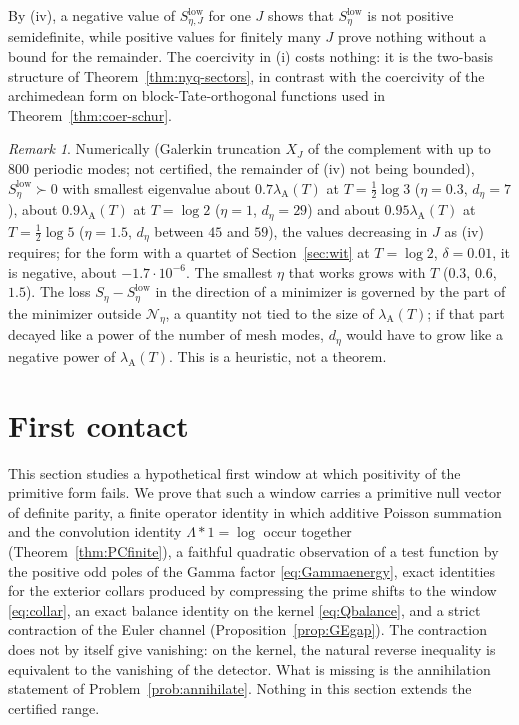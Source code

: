 \documentclass[11pt]{amsart}
\theoremstyle{definition}
\theoremstyle{remark}
\newtheorem{remark}[theorem]{Remark}
\newcommand{\lamA}{\lambda_{\mathrm A}(T)}
\begin{document}
By (iv), a negative value of $S^{\mathrm{low}}_{\eta,J}$ for one $J$ shows that $S^{\mathrm{low}}_\eta$ is not
positive semidefinite, while positive values for finitely many $J$ prove nothing without a bound for the remainder.
The coercivity in (i) costs nothing: it is the two-basis structure of Theorem~\ref{thm:nyq-sectors}, in contrast with
the coercivity of the archimedean form on block-Tate-orthogonal functions used in Theorem~\ref{thm:coer-schur}.

\begin{remark}\label{rem:nyq-schur-num}
Numerically (Galerkin truncation $X_J$ of the complement with up to $800$ periodic modes; not certified, the
remainder of (iv) not being bounded), $S^{\mathrm{low}}_\eta\succ0$ with smallest eigenvalue about $0.7\lamA$ at
$T=\frac12\log3$ ($\eta=0.3$, $d_\eta=7$), about $0.9\lamA$ at $T=\log2$ ($\eta=1$, $d_\eta=29$) and about $0.95\lamA$ at
$T=\frac12\log5$ ($\eta=1.5$, $d_\eta$ between $45$ and $59$), the values decreasing in $J$ as (iv) requires; for the
form with a quartet of Section~\ref{sec:wit} at $T=\log2$, $\delta=0.01$, it is negative, about $-1.7\cdot10^{-6}$. The
smallest $\eta$ that works grows with $T$ ($0.3$, $0.6$, $1.5$). The loss $S_\eta-S^{\mathrm{low}}_\eta$ in the direction of a
minimizer is governed by the part of the minimizer outside $\mathcal N_\eta$, a quantity not tied to the size of $\lamA$;
if that part decayed like a power of the number of mesh modes, $d_\eta$ would have to grow like a negative power of
$\lamA$. This is a heuristic, not a theorem.
\end{remark}


\section{First contact}\label{sec:firstcontact}

This section studies a hypothetical first window at which positivity of the primitive form fails. We
prove that such a window carries a primitive null vector of definite parity, a finite operator identity in
which additive Poisson summation and the convolution identity $\Lambda*1=\log$ occur together
(Theorem~\ref{thm:PCfinite}), a faithful quadratic observation of a test function by the positive odd poles
of the Gamma factor \eqref{eq:Gammaenergy}, exact identities for the exterior collars produced by compressing
the prime shifts to the window \eqref{eq:collar}, an exact balance identity on the kernel \eqref{eq:Qbalance},
and a strict contraction of the Euler channel (Proposition~\ref{prop:GEgap}). The contraction does not by
itself give vanishing: on the kernel, the natural reverse inequality is equivalent to the vanishing of the
detector. What is missing is the annihilation statement of Problem~\ref{prob:annihilate}. Nothing in this
section extends the certified range.
\end{document}
